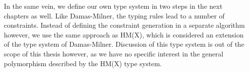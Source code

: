 In the same vein, we define our own type system in two steps in the next chapters as well.
Like Damas-Milner, the typing rules lead to a number of constraints.
Instead of defining the constraint generation in a separate algorithm however, we use the same approach as HM(X)\cite{odersky1999type}, which is considered\cite{pierce2005advanced} an extension of the type system of Damas-Milner.
Discussion of this type system is out of the scope of this thesis however, as we have no specific interest in the general polymorphism described by the HM(X) type system.

